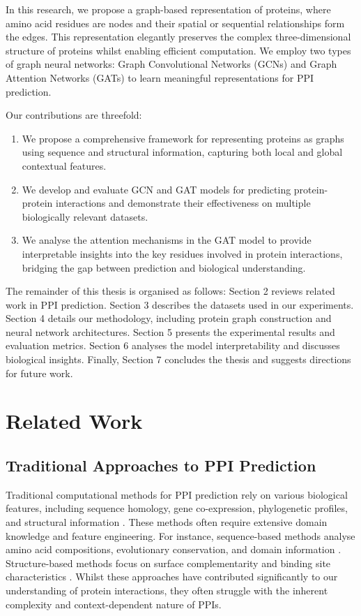 \documentclass[12pt,a4paper]{article}
\begin{document}
In this research, we propose a graph-based representation of proteins, where amino acid residues are nodes and their spatial or sequential relationships form the edges. This representation elegantly preserves the complex three-dimensional structure of proteins whilst enabling efficient computation. We employ two types of graph neural networks: Graph Convolutional Networks (GCNs) and Graph Attention Networks (GATs) to learn meaningful representations for PPI prediction.

Our contributions are threefold:
\begin{enumerate}
    \item We propose a comprehensive framework for representing proteins as graphs using sequence and structural information, capturing both local and global contextual features.
    \item We develop and evaluate GCN and GAT models for predicting protein-protein interactions and demonstrate their effectiveness on multiple biologically relevant datasets.
    \item We analyse the attention mechanisms in the GAT model to provide interpretable insights into the key residues involved in protein interactions, bridging the gap between prediction and biological understanding.
\end{enumerate}

The remainder of this thesis is organised as follows: Section 2 reviews related work in PPI prediction. Section 3 describes the datasets used in our experiments. Section 4 details our methodology, including protein graph construction and neural network architectures. Section 5 presents the experimental results and evaluation metrics. Section 6 analyses the model interpretability and discusses biological insights. Finally, Section 7 concludes the thesis and suggests directions for future work.

\section{Related Work}

\subsection{Traditional Approaches to PPI Prediction}

Traditional computational methods for PPI prediction rely on various biological features, including sequence homology, gene co-expression, phylogenetic profiles, and structural information \cite{valencia2002computational}. These methods often require extensive domain knowledge and feature engineering. For instance, sequence-based methods analyse amino acid compositions, evolutionary conservation, and domain information \cite{shen2007predicting}. Structure-based methods focus on surface complementarity and binding site characteristics \cite{huang2015scoring}. Whilst these approaches have contributed significantly to our understanding of protein interactions, they often struggle with the inherent complexity and context-dependent nature of PPIs.
\end{document}
